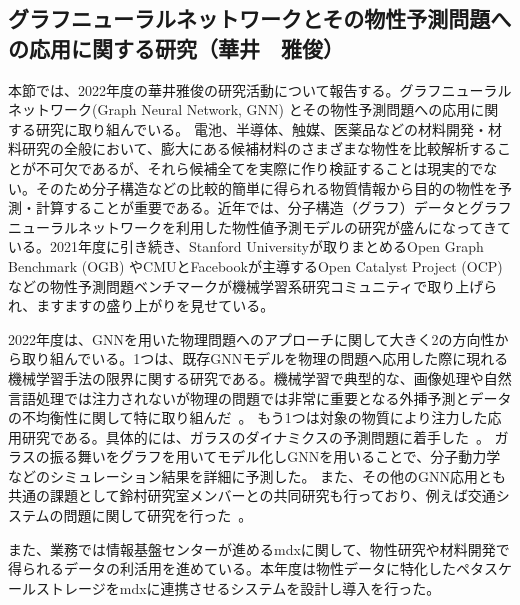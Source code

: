 \subsection{グラフニューラルネットワークとその物性予測問題への応用に関する研究（華井　雅俊）}

本節では、2022年度の華井雅俊の研究活動について報告する。グラフニューラルネットワーク(Graph Neural Network, GNN) とその物性予測問題への応用に関する研究に取り組んでいる。
電池、半導体、触媒、医薬品などの材料開発・材料研究の全般において、膨大にある候補材料のさまざまな物性を比較解析することが不可欠であるが、それら候補全てを実際に作り検証することは現実的でない。そのため分子構造などの比較的簡単に得られる物質情報から目的の物性を予測・計算することが重要である。近年では、分子構造（グラフ）データとグラフニューラルネットワークを利用した物性値予測モデルの研究が盛んになってきている。2021年度に引き続き、Stanford Universityが取りまとめるOpen Graph Benchmark (OGB) やCMUとFacebookが主導するOpen Catalyst Project (OCP) などの物性予測問題ベンチマークが機械学習系研究コミュニティで取り上げられ、ますますの盛り上がりを見せている。

2022年度は、GNNを用いた物理問題へのアプローチに関して大きく2の方向性から取り組んでいる。1つは、既存GNNモデルを物理の問題へ応用した際に現れる機械学習手法の限界に関する研究である。機械学習で典型的な、画像処理や自然言語処理では注力されないが物理の問題では非常に重要となる外挿予測とデータの不均衡性に関して特に取り組んだ~\cite{xsig-limin-hanai,xsig-takashige-hanai}。
もう1つは対象の物質により注力した応用研究である。具体的には、ガラスのダイナミクスの予測問題に着手した~\cite{gnn-glass}。 ガラスの振る舞いをグラフを用いてモデル化しGNNを用いることで、分子動力学などのシミュレーション結果を詳細に予測した。
また、その他のGNN応用とも共通の課題として鈴村研究室メンバーとの共同研究も行っており、例えば交通システムの問題に関して研究を行った~\cite{stgtrans-xiaohang}。

また、業務では情報基盤センターが進めるmdxに関して、物性研究や材料開発で得られるデータの利活用を進めている。本年度は物性データに特化したペタスケールストレージをmdxに連携させるシステムを設計し導入を行った。


